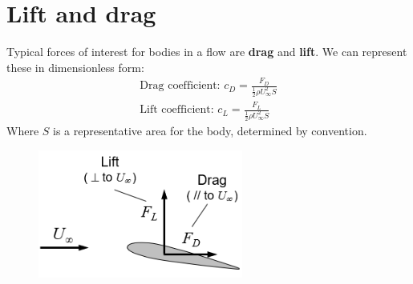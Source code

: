 \documentclass[class=report, crop=false, 12pt,a4paper]{standalone}
\begin{document}
\section{Lift and drag}
Typical forces of interest for bodies in a flow are \textbf{drag} and \textbf{lift}. We can represent these in dimensionless form:
\begin{gather}
  \textrm{Drag coefficient: }c_D = \frac{F_D}{\frac{1}{2} \rho U_\infty^2S}\\
  \textrm{Lift coefficient: }c_L = \frac{F_L}{\frac{1}{2}\rho U_\infty^2S}
\end{gather}
Where $S$ is a representative area for the body, determined by convention.
\begin{figure}[H]
  \centering
  \includegraphics[width = 0.6\textwidth]{../img/diagram9.png}
\end{figure}
\end{document}
